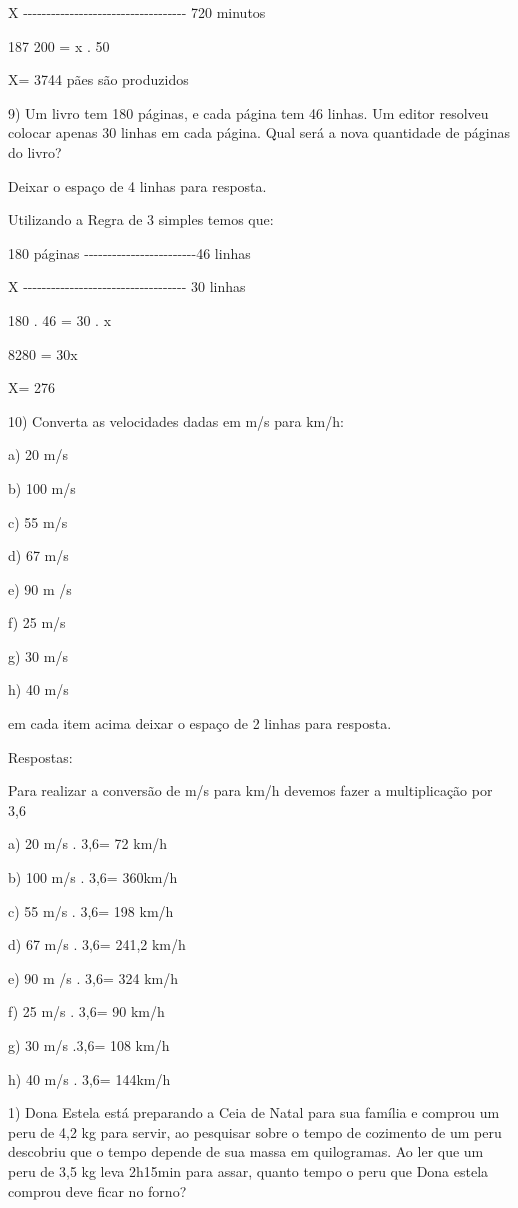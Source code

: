 X
-\/-\/-\/-\/-\/-\/-\/-\/-\/-\/-\/-\/-\/-\/-\/-\/-\/-\/-\/-\/-\/-\/-\/-\/-\/-\/-\/-\/-\/-\/-\/-\/-\/-\/-
720 minutos

187 200 = x . 50

X= 3744 pães são produzidos

9) Um livro tem 180 páginas, e cada página tem 46 linhas. Um editor
resolveu colocar apenas 30 linhas em cada página. Qual será a nova
quantidade de páginas do livro?

Deixar o espaço de 4 linhas para resposta.

Utilizando a Regra de 3 simples temos que:

180 páginas
-\/-\/-\/-\/-\/-\/-\/-\/-\/-\/-\/-\/-\/-\/-\/-\/-\/-\/-\/-\/-\/-\/-\/-46
linhas

X
-\/-\/-\/-\/-\/-\/-\/-\/-\/-\/-\/-\/-\/-\/-\/-\/-\/-\/-\/-\/-\/-\/-\/-\/-\/-\/-\/-\/-\/-\/-\/-\/-\/-\/-
30 linhas

180 . 46 = 30 . x

8280 = 30x

X= 276

10) Converta as velocidades dadas em m/s para km/h:

a) 20 m/s

b) 100 m/s

c) 55 m/s

d) 67 m/s

e) 90 m /s

f) 25 m/s

g) 30 m/s

h) 40 m/s

em cada item acima deixar o espaço de 2 linhas para resposta.

Respostas:

Para realizar a conversão de m/s para km/h devemos fazer a multiplicação
por 3,6

a) 20 m/s . 3,6= 72 km/h

b) 100 m/s . 3,6= 360km/h

c) 55 m/s . 3,6= 198 km/h

d) 67 m/s . 3,6= 241,2 km/h

e) 90 m /s . 3,6= 324 km/h

f) 25 m/s . 3,6= 90 km/h

g) 30 m/s .3,6= 108 km/h

h) 40 m/s . 3,6= 144km/h


1) Dona Estela está preparando a Ceia de Natal para sua família e
comprou um peru de 4,2 kg para servir, ao pesquisar sobre o tempo de
cozimento de um peru descobriu que o tempo depende de sua massa em
quilogramas. Ao ler que um peru de 3,5 kg leva 2h15min para assar,
quanto tempo o peru que Dona estela comprou deve ficar no forno?

